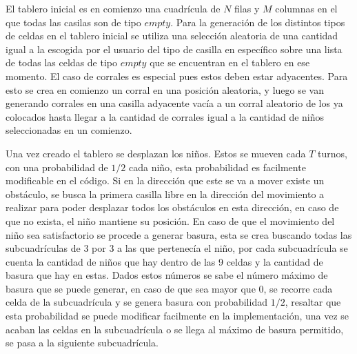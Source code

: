 \documentclass[titlepage,11pt]{scrartcl}
\begin{document}
El tablero inicial es en comienzo una cuadrícula de $N$ filas y $M$ columnas en el que todas las casilas son de tipo $empty$. Para la generación de los distintos tipos de celdas en el tablero inicial se utiliza una selección aleatoria de una cantidad igual a la escogida por el usuario del tipo de casilla en específico sobre una lista de todas las celdas de tipo $empty$ que se encuentran en el tablero en ese momento. El caso de corrales es especial pues estos deben estar adyacentes. Para esto se crea en comienzo un corral en una posición aleatoria, y luego se van generando corrales en una casilla adyacente vacía a un corral aleatorio de los ya colocados hasta llegar a la cantidad de corrales igual a la cantidad de niños seleccionadas en un comienzo.

Una vez creado el tablero se desplazan los niños. Estos se mueven cada $T$ turnos, con una probabilidad de $1/2$ cada niño, esta probabilidad es facilmente modificable en el código. Si en la dirección que este se va a mover existe un obstáculo, se busca la primera casilla libre en la dirección del movimiento a realizar para poder desplazar todos los obstáculos en esta dirección, en caso de que no exista, el niño mantiene su posición. En caso de que el movimiento del niño sea satisfactorio se procede a generar basura, esta se crea buscando todas las subcuadrículas de $3$ por $3$ a las que pertenecía el niño, por cada subcuadrícula se cuenta la cantidad de niños que hay dentro de las 9 celdas y la cantidad de basura que hay en estas. Dados estos números se sabe el número máximo de basura que se puede generar, en caso de que sea mayor que 0, se recorre cada celda de la subcuadrícula y se genera basura con probabilidad $1/2$, resaltar que esta probabilidad se puede modificar facilmente en la implementación, una vez se acaban las celdas en la subcuadrícula o se llega al máximo de basura permitido, se pasa a la siguiente subcuadrícula.
\end{document}
